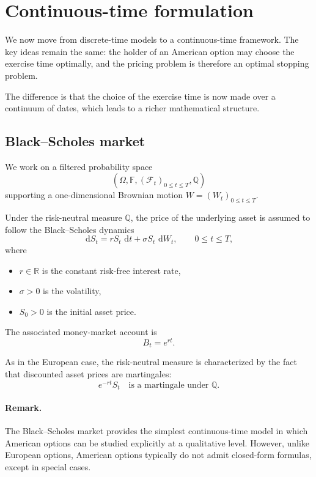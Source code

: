 \documentclass[11pt]{article}
\newcommand{\R}{\mathbb{R}}
\newcommand{\Qbb}{\mathbb{Q}}
\newcommand{\dd}{\,\mathrm{d}}
\theoremstyle{definition}
\theoremstyle{plain}
\begin{document}
\section{Continuous-time formulation}

We now move from discrete-time models to a continuous-time framework.
The key ideas remain the same:
the holder of an American option may choose the exercise time optimally,
and the pricing problem is therefore an optimal stopping problem.

The difference is that the choice of the exercise time is now made over
a continuum of dates, which leads to a richer mathematical structure.

\subsection{Black--Scholes market}

We work on a filtered probability space
\[
(\Omega,\mathbb{F},(\mathcal{F}_t)_{0\le t\le T},\mathbb{Q})
\]
supporting a one-dimensional Brownian motion \(W=(W_t)_{0\le t\le T}\).

Under the risk-neutral measure \(\Qbb\), the price of the underlying
asset is assumed to follow the Black--Scholes dynamics
\[
\dd S_t = r S_t\,\dd t + \sigma S_t\,\dd W_t,
\qquad 0\le t\le T,
\]
where
\begin{itemize}[leftmargin=1.4em]
    \item \(r\in\R\) is the constant risk-free interest rate,
    \item \(\sigma>0\) is the volatility,
    \item \(S_0>0\) is the initial asset price.
\end{itemize}

The associated money-market account is
\[
B_t = e^{rt}.
\]

As in the European case, the risk-neutral measure is characterized by the
fact that discounted asset prices are martingales:
\[
e^{-rt}S_t
\quad\text{is a martingale under }\Qbb.
\]

\paragraph{Remark.}
The Black--Scholes market provides the simplest continuous-time model in
which American options can be studied explicitly at a qualitative level.
However, unlike European options, American options typically do not admit
closed-form formulas, except in special cases.
\end{document}
